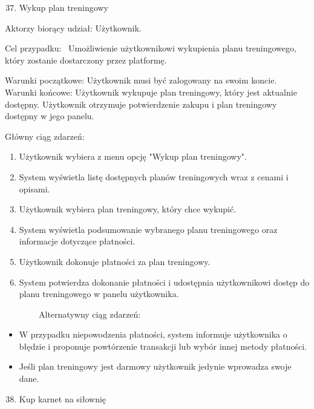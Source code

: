 \documentclass[
]{article}
\providecommand{\tightlist}{%
  \setlength{\itemsep}{0pt}\setlength{\parskip}{0pt}}
\begin{document}
{\hfill\break
}

\begin{enumerate}
\setcounter{enumi}{36}
\tightlist
\item
  {Wykup plan treningowy}
\end{enumerate}

{Aktorzy biorący udział: Użytkownik.}

{Cel przypadku: ~Umożliwienie użytkownikowi wykupienia planu
treningowego, który zostanie dostarczony przez platformę.}

{Warunki początkowe: Użytkownik musi być zalogowany na swoim koncie.\\
Warunki końcowe: Użytkownik wykupuje plan treningowy, który jest
aktualnie dostępny. Użytkownik otrzymuje potwierdzenie zakupu i plan
treningowy dostępny w jego panelu.}

{Główny ciąg zdarzeń:}

\begin{enumerate}
\tightlist
\item
  {Użytkownik wybiera z menu opcję "Wykup plan treningowy".}
\item
  {System wyświetla listę dostępnych planów treningowych wraz z cenami i
  opisami.}
\item
  {Użytkownik wybiera plan treningowy, który chce wykupić.}
\item
  {System wyświetla podsumowanie wybranego planu treningowego oraz
  informacje dotyczące płatności.}
\item
  {Użytkownik dokonuje płatności za plan treningowy.}
\item
  {System potwierdza dokonanie płatności i udostępnia użytkownikowi
  dostęp do planu treningowego w panelu użytkownika.}
\end{enumerate}

{~~~~~~~~Alternatywny ciąg zdarzeń:}

\begin{itemize}
\tightlist
\item
  {W przypadku niepowodzenia płatności, system informuje użytkownika o
  błędzie i proponuje powtórzenie transakcji lub wybór innej metody
  płatności.}
\item
  {Jeśli plan treningowy jest darmowy użytkownik jedynie wprowadza swoje
  dane.\\
  }
\end{itemize}

{}

\begin{enumerate}
\setcounter{enumi}{37}
\tightlist
\item
  {Kup karnet na siłownię}
\end{enumerate}
\end{document}

